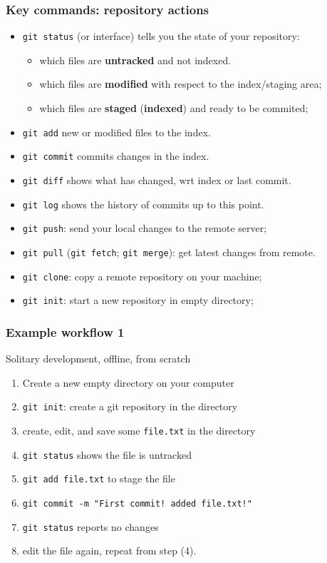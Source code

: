 \documentclass[10pt,svgnames]{beamer}
\begin{document}
\begin{frame}
\frametitle{Key commands: repository actions}

\begin{itemize}[<+->]
\item \lstinline{git status} (or interface) tells you the state of your repository:
\begin{itemize}
  \item which files are \textbf{untracked} and not indexed.
  \item which files are \textbf{modified} with respect to the index/staging area;
  \item which files are \textbf{staged} (\textbf{indexed}) and ready to be commited;
\end{itemize}
\item \lstinline|git add| new or modified files to the index.
\item \lstinline|git commit| commits changes in the index.
\bigskip
\item \lstinline{git diff} shows what has changed, wrt index or last commit.
\item \lstinline{git log} shows the history of commits up to this point.
\bigskip
\item \lstinline|git push|: send your local changes to the remote server;
\item \lstinline|git pull| (\lstinline{git fetch}; \lstinline{git merge}): get latest changes from remote.
\bigskip
\item \lstinline|git clone|: copy a remote repository on your machine;
\item \lstinline|git init|: start a new repository in empty directory;
\end{itemize}
\end{frame}


\begin{frame}
\frametitle{Example workflow 1}

\begin{block}{Solitary development, offline, from scratch}
    
\begin{enumerate}
  \item Create a new empty directory on your computer
  \item \lstinline|git init|: create a git repository in the directory
  \item create, edit, and save some \texttt{file.txt} in the directory
  \item \lstinline|git status| shows the file is untracked
  \item \lstinline|git add file.txt| to stage the file
  \item \lstinline|git commit -m "First commit! added file.txt!"|
  \item \lstinline|git status| reports no changes
  \item edit the file again, repeat from step (4).
\end{enumerate}
\end{block}
\end{frame}
\end{document}
